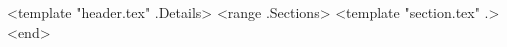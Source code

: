 \documentclass[letterpaper]{article}
\begin{document}
<template "header.tex" .Details>
<range .Sections>
<template "section.tex" .>
<end>
\end{document}

